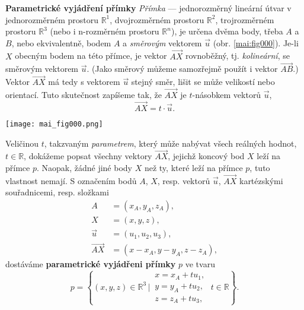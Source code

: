 \wikitextrule
\begin{example}\label{mai:exam001}
  \textbf{Parametrické vyjádření přímky}\newline\small
  \emph{Přímka} — jednorozměrný lineární útvar v jednorozměrném prostoru \(\mathbb{R}^1\), 
  dvojrozměrném prostoru \(\mathbb{R}^2\), trojrozměrném prostoru \(\mathbb{R}^3\) (nebo i 
  n-rozměrném prostoru \(\mathbb{R}^n\)), je určena dvěma body, třeba \(A\) a \(B\), nebo 
  ekvivalentně, bodem \(A\) a \emph{směrovým} vektorem \(\vec{u}\) (obr. \ref{mai:fig000}). 
  Je-li \(X\) obecným bodem na této přímce, je vektor \(\overrightarrow{AX}\) rovnoběžný, 
  tj. \emph{kolineární}, se směrovým vektorem \(\vec{u}\). (Jako směrový můžeme samozřejmě 
  použít i vektor \(\overrightarrow{AB}\).) Vektor \(\overrightarrow{AX}\) má tedy s 
  vektorem \(\vec{u}\) stejný směr, lišit se může velikostí nebo orientací. Tuto skutečnost 
  zapíšeme tak, že \(\overrightarrow{AX}\) je \(t\)-násobkem vektorů \(\vec{u}\),
  \begin{equation*}
  \overrightarrow{AX} = t \cdot \vec{u}.
  \end{equation*}
  {\centering
    \captionsetup{type=figure}
    \texttt{[image: mai\_fig000.png]}
    \par}
  Veličinou \(t\), takzvaným \emph{parametrem}, který může nabývat všech reálných hodnot, 
  \(t\in\mathbb{R}\), dokážeme popsat všechny vektory \(\overrightarrow{AX}\), jejichž 
  koncový bod \(X\) leží na přímce \(p\). Naopak, žádné jiné body \(X\) než ty, které leží na 
  přímce \(p\), tuto vlastnost nemají. S označením bodů \(A\), \(X\), resp. vektorů 
  \(\vec{u}\), \(\overrightarrow{AX}\) kartézskými souřadnicemi, resp. složkami
  \begin{align*}
                    A &= (x_A,y_A, z_A), \\ 
                    X &=(x,y,z),         \\
              \vec{u} &= (u_1,u_2,u_3),  \\ 
  \overrightarrow{AX} &= (x - x_A, y - y_A, z-z_A),
  \end{align*}
  dostáváme \textbf{parametrické vyjádřeni přímky} \(p\) ve tvaru
  \begin{equation}\label{MAI:eq_M001}
    p = \left\{(x,y,z)\in\mathbb{R}^3\,|\,
    \begin{matrix}
      x = x_A + tu_1,        \\
      y = y_A + tu_2,        \\
     z = z_A + tu_3,
    \end{matrix}
    \;t\in\mathbb{R}
    \right\}. 
  \end{equation}
  \normalsize
\end{example}
